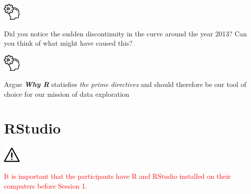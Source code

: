 \begin{minipage}[ht]{0.2\linewidth}
    \includegraphics[width=2\baselineskip]{./viz/icons/Think.png}  
\end{minipage}%
\begin{minipage}[ht]{0.75\linewidth}
Did you notice the sudden discontinuity in the curve around the year 2013? Can you think of what might have caused this?
\end{minipage}

\begin{minipage}[ht]{0.2\linewidth}
    \includegraphics[width=2\baselineskip]{./viz/icons/Think.png}  
\end{minipage}%
\begin{minipage}[ht]{0.75\linewidth}
Argue \textbf{\emph{Why R}} statisfies \emph{the prime directives} and should therefore be our tool of choice for our mission of data exploration
\end{minipage}
    
\section{RStudio}
\begin{mdframed}[backgroundcolor=cyan!10]
\par{}
\end{mdframed}

\begin{minipage}[ht]{0.2\linewidth}
    \includegraphics[width=2\baselineskip]{./viz/icons/Warning.png}  
\end{minipage}%
\begin{minipage}[ht]{0.75\linewidth}
\textcolor{red}{It is important that the participants have R and RStudio installed on their computers before Session 1.}
\end{minipage}

